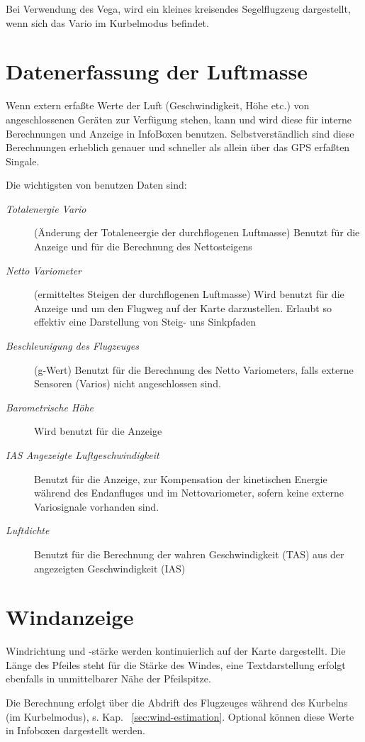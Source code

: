 Bei Verwendung des \textsf{Vega}, wird ein kleines kreisendes Segelflugzeug dargestellt, wenn sich das Vario
im Kurbelmodus befindet.
\section{Datenerfassung der Luftmasse}%

Wenn extern erfaßte Werte der Luft (Geschwindigkeit, Höhe etc.) von angeschlossenen Geräten zur Verfügung
stehen, kann und wird \xc diese für interne Berechnungen und Anzeige in InfoBoxen benutzen.
Selbstverständlich sind diese Berechnungen erheblich genauer und schneller als allein über das GPS
erfaßten Singale.

Die wichtigsten von  \xc benutzen Daten sind:
\begin{description}
\item[\textit{Totalenergie Vario}]
(Änderung der Totaleneergie der durchflogenen Luftmasse)
Benutzt für die Anzeige und für die Berechnung des Nettosteigens
\item[\textit{Netto Variometer}]
(ermitteltes Steigen der durchflogenen Luftmasse)
Wird benutzt für die Anzeige und um den Flugweg auf der Karte darzustellen.
Erlaubt so effektiv eine Darstellung von Steig- uns Sinkpfaden
\item[\textit{Beschleunigung des Flugzeuges}]
(g-Wert) Benutzt für die Berechnung des Netto Variometers, falls externe Sensoren (Varios) nicht angeschlossen sind.
\item[\textit{Barometrische Höhe}] Wird benutzt für die Anzeige
\item[\textit{IAS Angezeigte Luftgeschwindigkeit}]
Benutzt für die Anzeige, zur Kompensation der kinetischen Energie während des Endanfluges  und im Nettovariometer,
sofern keine externe Variosignale vorhanden sind.
\item[\textit{Luftdichte}] Benutzt für die Berechnung der wahren Geschwindigkeit (TAS) aus der angezeigten Geschwindigkeit (IAS)
\end{description}
\section{Windanzeige}
Windrichtung und -stärke werden kontinuierlich auf der Karte dargestellt.
Die Länge des Pfeiles steht für die Stärke des Windes, eine Textdarstellung erfolgt
ebenfalls in unmittelbarer Nähe der Pfeilspitze.

Die Berechnung erfolgt über die Abdrift des Flugzeuges während des Kurbelns (im Kurbelmodus), s. Kap.~ \ref{sec:wind-estimation}.
Optional können diese Werte in Infoboxen dargestellt werden.

